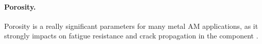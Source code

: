 \paragraph{Porosity.} Porosity is a really significant parameters for many metal AM applications, as it strongly impacts on fatigue resistance and crack propagation in the component \cite{edwards_electron_2013}. 
\begin{figure}
    \centering
    \qquad
\end{figure}
